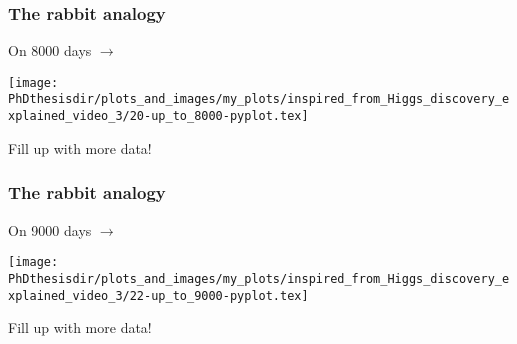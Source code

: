 \begin{frame}
\frametitle{The rabbit analogy}
\addtocounter{framenumber}{-1}
\transwipe[direction=90]
\begin{center}
\begin{minipage}[c]{.29\textwidth}
On \num{8000} days $\rightarrow$
\end{minipage}
\begin{minipage}[c]{.4\textwidth}
\vspace{-\baselineskip}
\texttt{[image: \\PhDthesisdir/plots\_and\_images/my\_plots/inspired\_from\_Higgs\_discovery\_explained\_video\_3/20-up\_to\_8000-pyplot.tex]}
\end{minipage}
\begin{minipage}[c]{.29\textwidth}
Fill up with more data!
\end{minipage}
\end{center}
\end{frame}


\begin{frame}
\frametitle{The rabbit analogy}
\addtocounter{framenumber}{-1}
\transwipe[direction=90]
\begin{center}
\begin{minipage}[c]{.29\textwidth}
On \num{9000} days $\rightarrow$
\end{minipage}
\begin{minipage}[c]{.4\textwidth}
\vspace{-\baselineskip}
\texttt{[image: \\PhDthesisdir/plots\_and\_images/my\_plots/inspired\_from\_Higgs\_discovery\_explained\_video\_3/22-up\_to\_9000-pyplot.tex]}
\end{minipage}
\begin{minipage}[c]{.29\textwidth}
Fill up with more data!
\end{minipage}
\end{center}
\end{frame}

